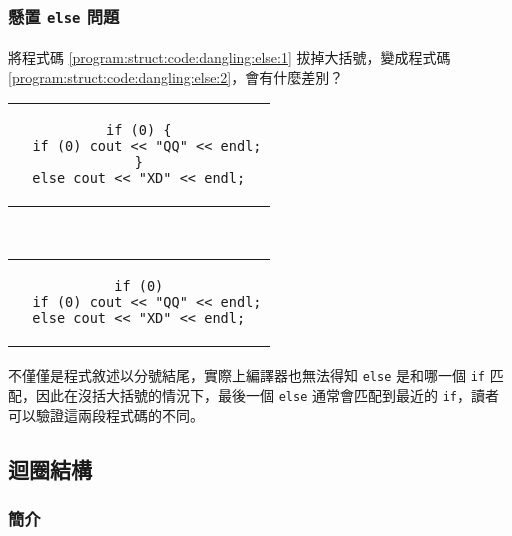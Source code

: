 \documentclass[12pt,a4paper,oneside]{report}
\begin{document}
\begin{CJK}{UTF8}{bkai}
\subsubsection{懸置 \lstinline!else! 問題}

\paragraph{}將程式碼 \ref{program:struct:code:dangling:else:1} 拔掉大括號，變成程式碼 \ref{program:struct:code:dangling:else:2}，會有什麼差別？

\begin{code}[h!]
\centering
\begin{subcode}{.5\textwidth}
  \centering
  \begin{tabular}{c}
  \begin{lstlisting}
if (0) {
  if (0) cout << "QQ" << endl;
}
else cout << "XD" << endl;
  \end{lstlisting}
  \end{tabular}
  \caption{危險的 \lstinline!else!}
  \label{program:struct:code:dangling:else:1}
\end{subcode}
~
\begin{subcode}{.45\textwidth}
  \centering
  \begin{tabular}{c}
  \begin{lstlisting}
if (0)
  if (0) cout << "QQ" << endl;
else cout << "XD" << endl;
  \end{lstlisting}
  \end{tabular}
  \caption{編譯器會不知道是哪一個 \lstinline!if! 的 \lstinline!else!}
  \label{program:struct:code:dangling:else:2}
\end{subcode}
\caption{懸置的 \lstinline!else!}
\label{program:struct:code:dangling:else}
\end{code}

\paragraph{}不僅僅是程式敘述以分號結尾，實際上編譯器也無法得知 \lstinline!else! 是和哪一個 \lstinline!if! 匹配，因此在沒括大括號的情況下，最後一個 \lstinline!else! 通常會匹配到最近的 \lstinline!if!，讀者可以驗證這兩段程式碼的不同。

\subsection{迴圈結構}

\subsubsection{簡介}


\end{CJK}
\end{document}
